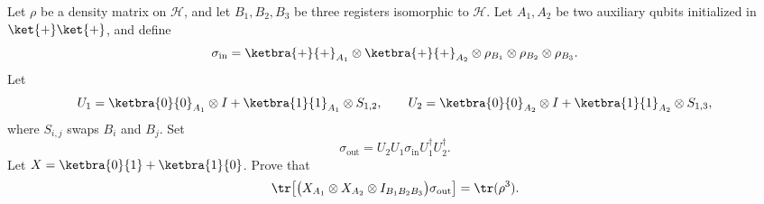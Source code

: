 Let $\rho$ be a density matrix on $\mathcal H$, and let $B_1,B_2,B_3$ be three registers isomorphic to $\mathcal H$.  Let $A_1,A_2$ be two auxiliary qubits initialized in $\ket{+}\ket{+}$, and define
$$
    \sigma_{\mathrm{in}}
    =
    \ketbra{+}{+}_{A_1}\otimes\ketbra{+}{+}_{A_2}
    \otimes \rho_{B_1}\otimes\rho_{B_2}\otimes\rho_{B_3}.
$$
Let
$$
    U_1=\ketbra{0}{0}_{A_1}\otimes I+\ketbra{1}{1}_{A_1}\otimes S_{1,2},
    \qquad
    U_2=\ketbra{0}{0}_{A_2}\otimes I+\ketbra{1}{1}_{A_2}\otimes S_{1,3},
$$
where $S_{i,j}$ swaps $B_i$ and $B_j$.  Set
$$
    \sigma_{\mathrm{out}}=U_2U_1\sigma_{\mathrm{in}}U_1^\dagger U_2^\dagger .
$$
Let $X=\ketbra{0}{1}+\ketbra{1}{0}$.  Prove that
$$
    \tr\!\left[
        \bigl(X_{A_1}\otimes X_{A_2}\otimes I_{B_1B_2B_3}\bigr)
        \sigma_{\mathrm{out}}
    \right]
    =
    \tr(\rho^3).
$$

